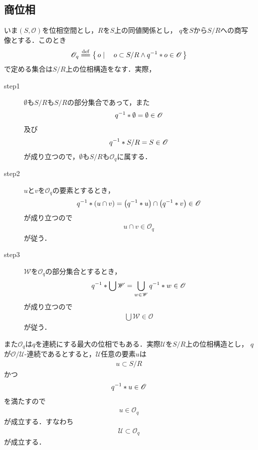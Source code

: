 \subsection{商位相}
	いま$(S,\mathscr{O})$を位相空間とし，$R$を$S$上の同値関係とし，
	$q$を$S$から$S/R$への商写像とする．このとき
	\begin{align}
		\mathscr{O}_{q} \defeq \Set{o}{o \subset S/R \wedge \inv{q} \ast o \in \mathscr{O}}
	\end{align}
	で定める集合は$S/R$上の位相構造をなす．実際，
	\begin{description}
		\item[step1] $\emptyset$も$S/R$も$S/R$の部分集合であって，また
			\begin{align}
				{q}^{-1} \ast \emptyset = \emptyset \in \mathscr{O}
			\end{align}
			及び
			\begin{align}
				{q}^{-1} \ast S/R = S \in \mathscr{O}
			\end{align}
			が成り立つので，$\emptyset$も$S/R$も$\mathscr{O}_{q}$に属する．
				
		\item[step2] $u$と$v$を$\mathscr{O}_{q}$の要素とするとき，
			\begin{align}
				{q}^{-1} \ast (u \cap v) = \left({q}^{-1} \ast u\right) \cap \left({q}^{-1} \ast v\right) \in \mathscr{O}
			\end{align}
			が成り立つので
			\begin{align}
				u \cap v \in \mathscr{O}_{q}
			\end{align}
			が従う．
			
		\item[step3] $\mathscr{W}$を$\mathscr{O}_{q}$の部分集合とするとき，
			\begin{align}
				{q}^{-1} \ast \bigcup \mathscr{W} = \bigcup_{w \in \mathscr{W}} {q}^{-1} \ast w \in \mathscr{O}
			\end{align}
			が成り立つので
			\begin{align}
				\bigcup \mathscr{W} \in \mathscr{O}
			\end{align}
			が従う．
	\end{description}
	
	また$\mathscr{O}_{q}$は$q$を連続にする最大の位相でもある．実際$\mathscr{U}$を$S/R$上の位相構造とし，
	$q$が$\mathscr{O}/\mathscr{U}$-連続であるとすると，$\mathscr{U}$任意の要素$u$は
	\begin{align}
		u \subset S/R
	\end{align}
	かつ
	\begin{align}
		{q}^{-1} \ast u \in \mathscr{O}
	\end{align}
	を満たすので
	\begin{align}
		u \in \mathscr{O}_{q}
	\end{align}
	が成立する．すなわち
	\begin{align}
		\mathscr{U} \subset \mathscr{O}_{q}
	\end{align}
	が成立する．
	

